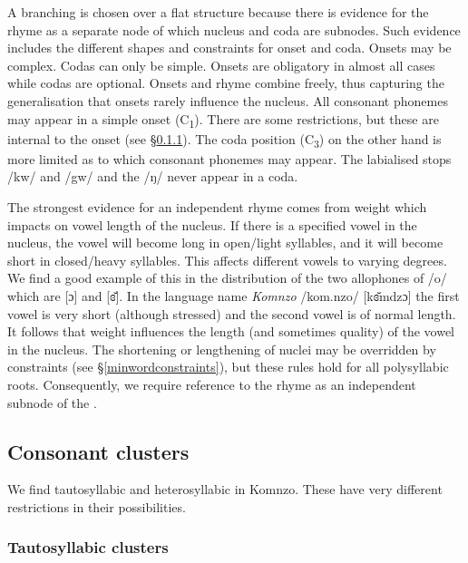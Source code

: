 A branching  is chosen over a flat structure because there is evidence for the rhyme as a separate node of which nucleus and coda are subnodes. Such evidence includes the different shapes and constraints for onset and coda. Onsets may be complex. Codas can only be simple. Onsets are obligatory in almost all cases while codas are optional. Onsets and rhyme combine freely, thus capturing the generalisation that onsets rarely influence the nucleus. All consonant phonemes may appear in a simple onset (C\textsubscript{1}). There are some restrictions, but these are internal to the onset (see \S{}\ref{tautosyllabiccc}). The coda position (C\textsubscript{3}) on the other hand is more limited as to which consonant phonemes may appear. The labialised  stops /kw/ and /gw/ and the   /ŋ/ never appear in a coda.%

The strongest evidence for an independent rhyme comes from  weight which impacts on vowel length of the nucleus. If there is a specified vowel in the nucleus, the vowel will become long in open/light syllables, and it will become short in closed/heavy syllables. This affects different vowels to varying degrees. We find a good example of this in the distribution of the two allophones of /o/ which are [ɔ] and [ɞ̆]. In the language name \emph{Komnzo} /kom.nzo/ [kɞ̆mdzɔ] the first vowel is very short (although stressed) and the second vowel is of normal length. It follows that  weight influences the length (and sometimes quality) of the vowel in the nucleus. The shortening or lengthening of nuclei may be overridden by  constraints (see \S{}\ref{minwordconstraints}), but these rules hold for all polysyllabic roots. Consequently, we require reference to the rhyme as an independent subnode of the .

\subsection{Consonant clusters} \label{consonantclusters}

We find tautosyllabic and heterosyllabic  in Komnzo. These have very different restrictions in their possibilities.

\subsubsection{Tautosyllabic clusters} \label{tautosyllabiccc}


